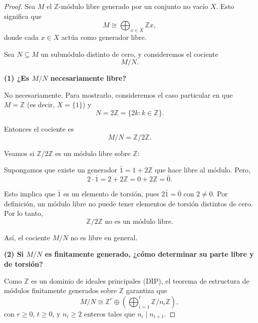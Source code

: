 	
	\begin{ejercicio}
	\end{ejercicio}

\begin{proof}
	Sea \( M \) el \(\mathbb{Z}\)-módulo libre generado por un conjunto no vacío \( X \). Esto significa que
	\[
	M \cong \bigoplus_{x \in X} \mathbb{Z} x,
	\]
	donde cada \( x \in X \) actúa como generador libre.
	
	Sea \( N \subseteq M \) un submódulo distinto de cero, y consideremos el cociente
	\[
	M / N.
	\]
	
	\textbf{(1) ¿Es \( M/N \) necesariamente libre?}
	
	No necesariamente. Para mostrarlo, consideremos el caso particular en que \( M = \mathbb{Z} \) (es decir, \( X = \{1\} \)) y
	\[
	N = 2 \mathbb{Z} = \{ 2k : k \in \mathbb{Z} \}.
	\]
	
	Entonces el cociente es
	\[
	M/N = \mathbb{Z} / 2\mathbb{Z}.
	\]
	
	Veamos si \( \mathbb{Z} / 2\mathbb{Z} \) es un módulo libre sobre \(\mathbb{Z}\):
	
	Supongamos que existe un generador \( \bar{1} = 1 + 2\mathbb{Z} \) que hace libre al módulo. Pero,
	\[
	2 \cdot \bar{1} = 2 + 2\mathbb{Z} = 0 + 2\mathbb{Z} = \bar{0}.
	\]
	
	Esto implica que \( \bar{1} \) es un elemento de torsión, pues \(2 \bar{1} = \bar{0}\) con \(2 \neq 0\). Por definición, un módulo libre no puede tener elementos de torsión distintos de cero. Por lo tanto,
	\[
	\mathbb{Z} / 2\mathbb{Z} \text{ no es un módulo libre}.
	\]
	
	Así, el cociente \( M/N \) no es libre en general.
	
	\bigskip
	
	\textbf{(2) Si \(M/N\) es finitamente generado, ¿cómo determinar su parte libre y de torsión?}
	
	Como \(\mathbb{Z}\) es un dominio de ideales principales (DIP), el teorema de estructura de módulos finitamente generados sobre \(\mathbb{Z}\) garantiza que
	\[
	M/N \cong \mathbb{Z}^r \oplus \left(\bigoplus_{i=1}^t \mathbb{Z}/n_i \mathbb{Z}\right),
	\]
	con \(r \geq 0\), \(t \geq 0\), y \(n_i \geq 2\) enteros tales que \(n_i \mid n_{i+1}\).
	

\end{proof}
